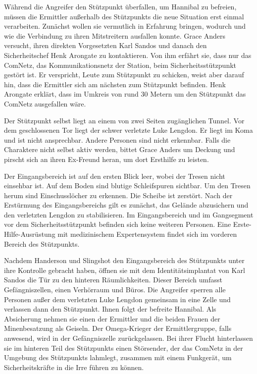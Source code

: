 
Während die Angreifer den Stützpunkt überfallen, um Hannibal zu befreien, müssen die Ermittler außerhalb des Stützpunkts die neue Situation erst einmal verarbeiten. Zunächst wollen sie vermutlich in Erfahrung bringen, wodurch und wie die Verbindung zu ihren Mitstreitern ausfallen konnte. Grace Anders versucht, ihren direkten Vorgesetzten Karl Sandos und danach den Sicherheitschef Henk Arongate zu kontaktieren. Von ihm erfährt sie, dass nur das ComNetz, das Kommunikationsnetz der Station, beim Sicherheitsstützpunkt gestört ist. Er verspricht, Leute zum Stützpunkt zu schicken, weist aber darauf hin, dass die Ermittler sich am nächsten zum Stützpunkt befinden. Henk Arongate erklärt, dass im Umkreis von rund 30 Metern um den Stützpunkt das ComNetz ausgefallen wäre.

Der Stützpunkt selbst liegt an einem von zwei Seiten zugänglichen Tunnel. Vor dem geschlossenen Tor liegt der schwer verletzte Luke Lengdon. Er liegt im Koma und ist nicht ansprechbar. Andere Personen sind nicht erkennbar. Falls die Charaktere nicht selbst aktiv werden, bittet Grace Anders um Deckung und pirscht sich an ihren Ex-Freund heran, um dort Ersthilfe zu leisten.

Der Eingangsbereich ist auf den ersten Blick leer, wobei der Tresen nicht einsehbar ist. Auf dem Boden sind blutige Schleifspuren sichtbar. Um den Tresen herum sind Einschusslöcher zu erkennen. Die Scheibe ist zerstört. Nach der Erstürmung des Eingangsbereichs gilt es zunächst, das Gelände abzusichern und den verletzten Lengdon zu stabilisieren. Im Eingangsbereich und im Gangsegment vor dem Sicherheitsstützpunkt befinden sich keine weiteren Personen. Eine Erste-Hilfe-Ausrüstung mit medizinischem Expertensystem findet sich im vorderen Bereich des Stützpunkts.


Nachdem Handerson und Slingshot den Eingangsbereich des Stützpunkts unter ihre Kontrolle gebracht haben, öffnen sie mit dem Identitätsimplantat von Karl Sandos die Tür zu den hinteren Räumlichkeiten. Dieser Bereich umfasst Gefängniszellen, einen Verhörraum und Büros. Die Angreifer sperren alle Personen außer dem verletzten Luke Lengdon gemeinsam in eine Zelle und verlassen dann den Stützpunkt. Ihnen folgt der befreite Hannibal. Als Absicherung nehmen sie einen der Ermittler und die beiden Frauen der Minenbesatzung als Geiseln. Der Omega-Krieger der Ermittlergruppe, falls anwesend, wird in der Gefängniszelle zurückgelassen. Bei ihrer Flucht hinterlassen sie im hinteren Teil des Stützpunkts einen Störsender, der das ComNetz in der Umgebung des Stützpunkts lahmlegt, zusammen mit einem Funkgerät, um Sicherheitskräfte in die Irre führen zu können.

